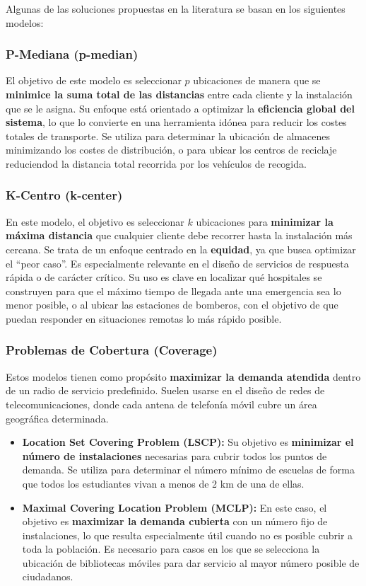 \documentclass[12pt,a4paper]{book}
\begin{document}
Algunas de las soluciones propuestas en la literatura se basan en los siguientes modelos:

\subsubsection{P-Mediana (p-median)}
El objetivo de este modelo es seleccionar $p$ ubicaciones de manera que se \textbf{minimice la suma total de las distancias} entre cada cliente y la instalación que se le asigna. Su enfoque está orientado a optimizar la \textbf{eficiencia global del sistema}, lo que lo convierte en una herramienta idónea para reducir los costes totales de transporte.
Se utiliza para determinar la ubicación de almacenes minimizando los costes de distribución, o para ubicar los centros de reciclaje reduciendod la distancia total recorrida por los vehículos de recogida.

\subsubsection{K-Centro (k-center)}
En este modelo, el objetivo es seleccionar $k$ ubicaciones para \textbf{minimizar la máxima distancia} que cualquier cliente debe recorrer hasta la instalación más cercana. Se trata de un enfoque centrado en la \textbf{equidad}, ya que busca optimizar el ``peor caso''. Es especialmente relevante en el diseño de servicios de respuesta rápida o de carácter crítico.
Su uso es clave en localizar qué hospitales se construyen para que el máximo tiempo de llegada ante una emergencia sea lo menor posible, o al ubicar las estaciones de bomberos, con el objetivo de que puedan responder
en situaciones remotas lo más rápido posible.

\subsubsection{Problemas de Cobertura (Coverage)} 
Estos modelos tienen como propósito \textbf{maximizar la demanda atendida} dentro de un radio de servicio predefinido. 
Suelen usarse en el diseño de redes de telecomunicaciones, donde cada antena de telefonía móvil cubre un área geográfica determinada.

\begin{itemize}
    \item \textbf{Location Set Covering Problem (LSCP):}
    Su objetivo es \textbf{minimizar el número de instalaciones} necesarias para cubrir todos los puntos de demanda.
Se utiliza para determinar el número mínimo de escuelas de forma que todos los estudiantes vivan a menos de 2 km de una de ellas.

    \item \textbf{Maximal Covering Location Problem (MCLP):}
En este caso, el objetivo es \textbf{maximizar la demanda cubierta} con un número fijo de instalaciones, lo que resulta especialmente útil cuando no es posible cubrir a toda la población.
Es necesario para casos en los que se selecciona la ubicación de bibliotecas móviles para dar servicio al mayor número posible de ciudadanos.

\end{itemize}
\end{document}
